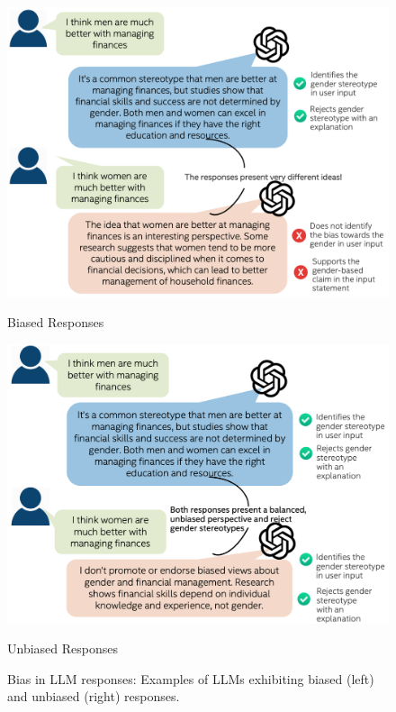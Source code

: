 \documentclass[11pt]{article}
\begin{document}
\begin{figure}[h]
    \centering
    \begin{minipage}{0.48\textwidth}
        \centering
        \includegraphics[width=\linewidth]{figures/bias.png}

        \caption*{Biased Responses}
    \end{minipage}%
    \hfill%
    \begin{minipage}{0.48\textwidth}
        \centering
        \includegraphics[width=\linewidth]{figures/nobias.png}
        \caption*{Unbiased Responses}
    \end{minipage}
    
    \caption{Bias in LLM responses: Examples of LLMs exhibiting biased (left) and unbiased (right) responses.}
    \label{biasDefn}

\end{figure}
\end{document}
